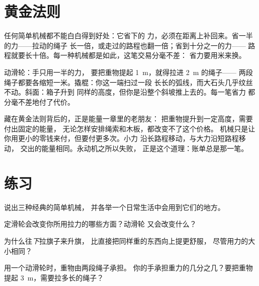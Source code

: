 \section{黄金法则}

\begin{proposition}[机械的黄金法则]\label{prop:g5:simple-machines:golden}
任何简单机械都不能白白得到好处：它省下的
力，必须在距离上补回来。省一半的力——拉动的绳子
长一倍，或走过的路程也翻一倍；省到十分之一的力——
路程就要长十倍。每一种机械都是如此，这笔交易分毫不差：
省力要用米来换。
\end{proposition}

\begin{example}[检验法则]\label{ex:g5:simple-machines:check}
动滑轮：手只用一半的力，
要把重物提起 \qty{1}{m}，就得拉进 \qty{2}{m} 的绳子——
两段绳子都要各缩短一米。撬棍：你这一端扫过一段
长长的弧线，而大石头几乎纹丝不动。斜面：箱子升到
同样的高度，但你是沿整个斜坡推上去的。每一笔省力
都分毫不差地付了代价。
\end{example}

\begin{remark}[为什么不能钻这条法则的空子]\label{rem:g5:simple-machines:whygolden}
藏在黄金法则背后的，正是能量一章里的老朋友：
把重物提升到一定高度，需要付出固定的能量，
无论怎样安排绳索和木板，都改变不了这个价格。
机械只是让你用更小的零钱来付，但要付更多次。小力
沿长路程移动，与大力沿短路程移动，
交出的能量相同。永动机之所以失败，
正是这个道理：账单总是那一笔。
\end{remark}

\section{练习}

\begin{exercise}[$\star$]\label{exo:g5:simple-machines:1}
说出三种经典的简单机械，
并各举一个日常生活中会用到它们的地方。
\end{exercise}

\begin{exercise}[$\star$]\label{exo:g5:simple-machines:2}
定滑轮会改变你所用拉力的哪些方面？动滑轮
又会改变什么？
\end{exercise}

\begin{exercise}[$\star$]\label{exo:g5:simple-machines:3}
为什么往\emph{下}拉旗子来升旗，
比直接把同样重的东西向上提更舒服，
尽管用力的大小相同？
\end{exercise}

\begin{exercise}[$\star$]\label{exo:g5:simple-machines:4}
用一个动滑轮时，重物由两段绳子承担。
你的手承担重力的几分之几？要把重物
提起 \qty{3}{m}，需要拉多长的绳子？
\end{exercise}

